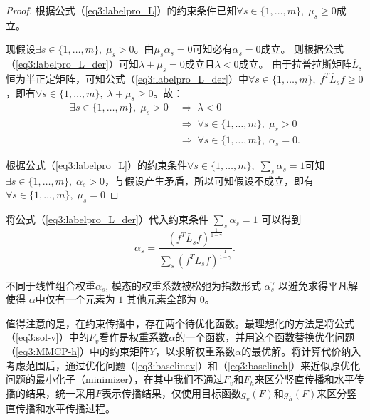 \begin{proof}
    根据公式（\ref{eq3:labelpro_L}）的约束条件已知$ \forall s \in \{1,\dots,m\}, \;\mu_s \ge 0$成立。

    现假设$\exists s \in \{1,\dots,m\}, \; \mu_s>0 $。由$ \mu_s\alpha_s=0 $可知必有$\alpha_s=0 $成立。
    则根据公式（\ref{eq3:labelpro_L_der}）可知$\lambda + \mu_s = 0 $成立且$ \lambda<0 $成立。
    由于拉普拉斯矩阵$ {\bar{{L}}}_s $恒为半正定矩阵\cite{chung1997spectral}，可知公式（\ref{eq3:labelpro_L_der}）中$\forall s \in \{1,\dots,m\}, \;{f}^T {\bar{{L}}}_s{f} \ge 0$，即有$\forall s \in \{1,\dots,m\}, \; \lambda + \mu_s \ge 0 $。故：
    \begin{equation}
        \begin{split}
        \exists s \in \{1,\dots,m\}, \; \mu_s>0\; &\Rightarrow \;\lambda<0 \\&\Rightarrow \;\forall s \in \{1,\dots,m\}, \; \mu_s>0 \\&\Rightarrow \; \forall s \in \{1,\dots,m\}, \;\alpha_s=0.     
        \end{split}
    \end{equation}

    根据公式（\ref{eq3:labelpro_L}）的约束条件$ \forall s \in \{1,\dots,m\}, \;\sum_s \alpha_s = 1$可知$ \exists s \in \{1,\dots,m\}, \;\alpha_s>0$，与假设产生矛盾，所以可知假设不成立，即有$\forall s \in \{1,\dots,m\}, \; \mu_s=0 $
\end{proof}

将公式（\ref{eq3:labelpro_L_der}）代入约束条件 $ \sum_s \alpha_s=1 $ 可以得到
\begin{equation}
\alpha_s = \frac{({f}^T \bar{{L}}_s{f})^\frac{1}{1-\gamma}}{\sum_s({f}^T \bar{{L}}_s{f})^\frac{1}{1-\gamma}}.
\end{equation}

不同于线性组合权重$ \alpha_s$, 模态的权重系数被松弛为指数形式 $ \alpha_s^\gamma $ 以避免求得平凡解使得 $ {\alpha} $中仅有一个元素为 $ 1 $ 其他元素全部为 $ 0 $。

值得注意的是，在约束传播中，存在两个待优化函数。最理想化的方法是将公式（\ref{eq3:sol-v}）中的$ {F}_v $看作是权重系数$\alpha$的一个函数，并用这个函数替换优化问题（\ref{eq3:MMCP-h}）中的约束矩阵$Y$，以求解权重系数$\alpha$的最优解。将计算代价纳入考虑范围后，通过优化问题（\ref{eq3:baselinev}）和（\ref{eq3:baselineh}）来近似原优化问题的最小化子（minimizer），在其中我们不通过$F_v$和$F_h$来区分竖直传播和水平传播的结果，统一采用$F$表示传播结果，仅使用目标函数$g_v({F})$和$g_h({F})$来区分竖直传播和水平传播过程。

